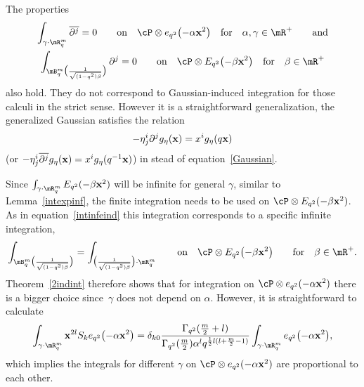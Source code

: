 \begin{remark}
\label{gengauss}
The properties
\begin{gather*}
\int_{\gamma\cdot\mR^m_q}\overline{\partial^j}=0\qquad \mbox{on}\quad  \cP\otimes e_{q^2}\big({-}\alpha\bold{x}^2\big)\quad \mbox{for}\quad \alpha,\gamma\in\mR^+\qquad\mbox{and}\\
\int_{\mB^m_q\big(\frac{1}{\sqrt{(1-q^2)\beta}}\big)}\partial^j=0\qquad \mbox{on}\quad \cP\otimes E_{q^2}\big({-}\beta\bold{x}^2\big)\quad\mbox{for}\quad\beta\in\mR^+
\end{gather*}
also hold. They do not correspond to Gaussian-induced integration for those calculi in the strict sense. However it is a straightforward generalization, the generalized Gaussian satisf\/ies the relation
\begin{gather*}
-\eta^i_{ j}\partial^jg_{\eta}(\bold{x}) = x^i g_\eta(q\bold{x})
\end{gather*}
(or $-\eta^i_{ j}\overline{\partial^j}g_{\eta}(\bold{x})=x^i g_\eta(q^{-1}\bold{x})$) in stead of equation~\eqref{Gaussian}.
\end{remark}

Since $\int_{\gamma\cdot\mR^m_q}E_{q^2}(-\beta\bold{x}^2)$ will be inf\/inite for general $\gamma$, similar to Lemma~\ref{intexpinf}, the f\/inite integration needs to be used on $\cP\otimes E_{q^2}(-\beta\bold{x}^2)$. As in equation~\eqref{intinfeind} this integration corresponds to a specif\/ic inf\/inite integration,
\begin{gather*}
\label{intbetainf}
\int_{\mB^m_q\big(\frac{1}{\sqrt{(1-q^2)\beta}}\big)} = \int_{\big(\frac{1}{\sqrt{(1-q^2)\beta}}\big)\cdot\mR^m_q}\qquad\mbox{on}\quad \cP\otimes E_{q^2}\big({-}\beta\bold{x}^2\big)\qquad\mbox{for}\quad\beta\in\mR^+.
\end{gather*}
Theorem~\ref{2indint} therefore shows that for integration on $\cP\otimes e_{q^2}(-\alpha\bold{x}^2)$ there is a bigger choice since~$\gamma$ does not depend on $\alpha$. However, it is straightforward to calculate
\begin{gather*}
\int_{\gamma\cdot\mR^m_q}\bold{x}^{2l}S_ke_{q^2}\big({-}\alpha\bold{x}^2\big)=
\delta_{k0}\frac{\Gamma_{q^2}(\frac{m}{2}+l)}{\Gamma_{q^2}(\frac{m}{2})\alpha^lq^{\frac{1}{2}l(l+\frac{m}{2}-1)}}
\int_{\gamma\cdot\mR^m_q}e_{q^2}\big({-}\alpha\bold{x}^2\big),
\end{gather*}
which implies the integrals for dif\/ferent $\gamma$ on $\cP\otimes e_{q^2}(-\alpha\bold{x}^2)$ are proportional to each other.



